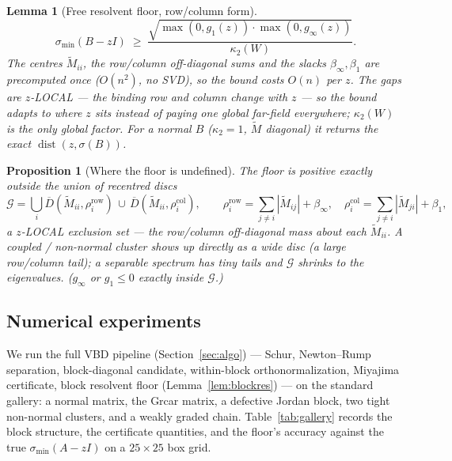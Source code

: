 \documentclass[11pt,a4paper]{article}
\newcommand{\abs}[1]{\left|#1\right|}
\theoremstyle{plain}
\newtheorem{lemma}[theorem]{Lemma}
\newtheorem{proposition}[theorem]{Proposition}
\theoremstyle{definition}
\begin{document}
\begin{lemma}[Free resolvent floor, row/column form]\label{lem:freeres}
\[
  \sigma_{\min}(B-zI)\;\ge\;
  \frac{\sqrt{\max(0,g_1(z))\cdot\max(0,g_\infty(z))}}{\kappa_2(W)} .
\]
The centres $\widetilde M_{ii}$, the row/column off-diagonal sums and the slacks
$\beta_\infty,\beta_1$ are precomputed once ($O(n^2)$, \emph{no} SVD), so the bound costs
$O(n)$ per $z$. The gaps are $z$-LOCAL --- the binding row and column change with $z$ ---
so the bound adapts to where $z$ sits instead of paying one global far-field everywhere;
$\kappa_2(W)$ is the only global factor. For a normal $B$ ($\kappa_2=1$, $\widetilde M$
diagonal) it returns the exact $\operatorname{dist}(z,\sigma(B))$.
\end{lemma}

\begin{proposition}[Where the floor is undefined]\label{prop:grey}
The floor is positive exactly outside the union of recentred discs
\[
  \mathcal G=\bigcup_i \overline D(\widetilde M_{ii},\rho_i^{\mathrm{row}})\,\cup\,
                       \overline D(\widetilde M_{ii},\rho_i^{\mathrm{col}}),\qquad
  \rho_i^{\mathrm{row}}=\!\sum_{j\ne i}\abs{\widetilde M_{ij}}+\beta_\infty,\quad
  \rho_i^{\mathrm{col}}=\!\sum_{j\ne i}\abs{\widetilde M_{ji}}+\beta_1,
\]
a $z$-LOCAL exclusion set --- the row/column off-diagonal mass about each $\widetilde
M_{ii}$. A coupled / non-normal cluster shows up directly as a wide disc (a large
row/column tail); a separable spectrum has tiny tails and $\mathcal G$ shrinks to the
eigenvalues. ($g_\infty$ or $g_1\le0$ exactly inside $\mathcal G$.)
\end{proposition}

\subsection*{Numerical experiments}

We run the full VBD pipeline (Section~\ref{sec:algo}) --- Schur, Newton--Rump separation,
block-diagonal candidate, within-block orthonormalization, Miyajima certificate, block
resolvent floor (Lemma~\ref{lem:blockres}) --- on the standard gallery: a normal matrix, the
Grcar matrix, a defective Jordan block, two tight non-normal clusters, and a weakly graded
chain. Table~\ref{tab:gallery} records the block structure, the certificate quantities, and
the floor's accuracy against the true $\sigma_{\min}(A-zI)$ on a $25\times25$ box grid.
\end{document}
